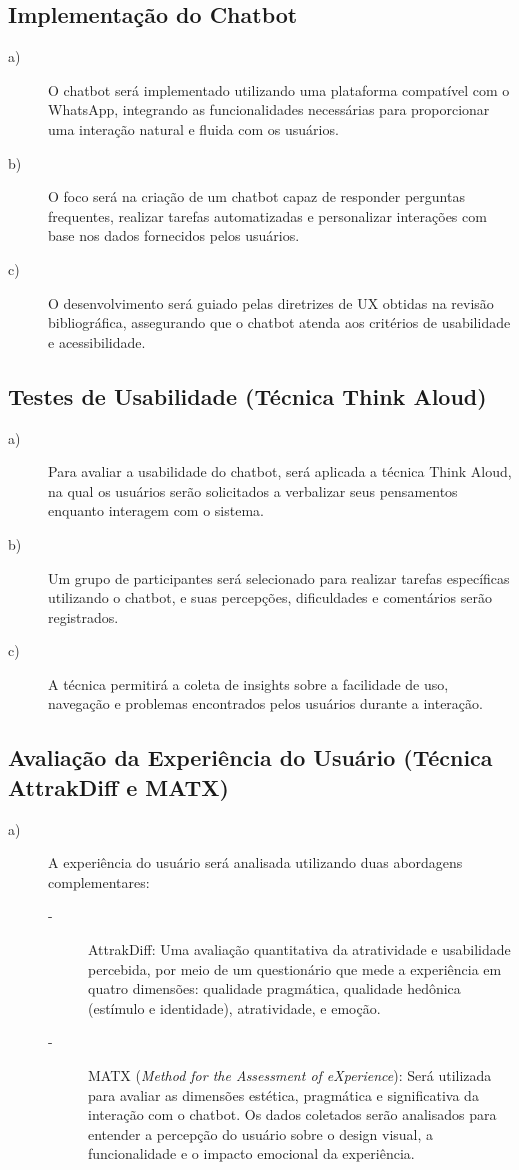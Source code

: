 \subsection{Implementação do Chatbot}
\begin{description}
    \item[a)] O chatbot será implementado utilizando uma plataforma compatível com o WhatsApp, integrando as funcionalidades necessárias para proporcionar uma interação natural e fluida com os usuários.
    \item[b)] O foco será na criação de um chatbot capaz de responder perguntas frequentes, realizar tarefas automatizadas e personalizar interações com base nos dados fornecidos pelos usuários.
    \item[c)] O desenvolvimento será guiado pelas diretrizes de UX obtidas na revisão bibliográfica, assegurando que o chatbot atenda aos critérios de usabilidade e acessibilidade.
\end{description}
\subsection{Testes de Usabilidade (Técnica Think Aloud)}
\begin{description}
    \item[a)] Para avaliar a usabilidade do chatbot, será aplicada a técnica Think Aloud, na qual os usuários serão solicitados a verbalizar seus pensamentos enquanto interagem com o sistema.
    \item[b)] Um grupo de participantes será selecionado para realizar tarefas específicas utilizando o chatbot, e suas percepções, dificuldades e comentários serão registrados.
    \item[c)] A técnica permitirá a coleta de insights sobre a facilidade de uso, navegação e problemas encontrados pelos usuários durante a interação.
\end{description}

\subsection{Avaliação da Experiência do Usuário (Técnica AttrakDiff e MATX)}
\begin{description}
    \item[a)] A experiência do usuário será analisada utilizando duas abordagens complementares:
    \begin{description}
    \item[-] AttrakDiff: Uma avaliação quantitativa da atratividade e usabilidade percebida, por meio de um questionário que mede a experiência em quatro dimensões: qualidade pragmática, qualidade hedônica (estímulo e identidade), atratividade, e emoção.
    \item[-] MATX (\textit{Method for the Assessment of eXperience}): Será utilizada para avaliar as dimensões estética, pragmática e significativa da interação com o chatbot. Os dados coletados serão analisados para entender a percepção do usuário sobre o design visual, a funcionalidade e o impacto emocional da experiência.
\end{description}
\end{description}


